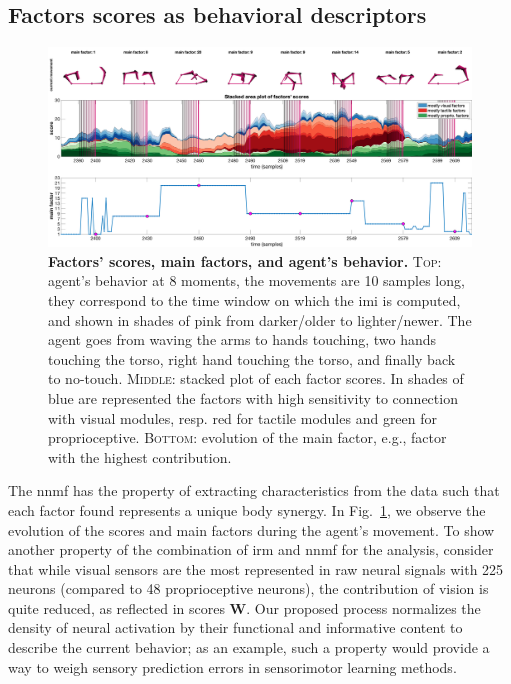 \documentclass[letterpaper, 10 pt, conference]{ieeeconf}  %
\begin{document}
\subsection{Factors scores as behavioral descriptors}
\begin{figure}[h!]
    \centering
    \includegraphics[width=.99\textwidth]{fig/factors_example_time.png}
    \caption{\textbf{Factors' scores, main factors, and agent's behavior.} \textsc{Top}: agent's behavior at 8 moments, the movements are 10 samples long, they correspond to the time window on which the \acl{imi} is computed, and shown in shades of pink from darker/older to lighter/newer. The agent goes from waving the arms to hands touching, two hands touching the torso, right hand touching the torso, and finally back to no-touch. \textsc{Middle}: stacked plot of each factor scores. In shades of blue are represented the factors with high sensitivity to connection with visual modules, resp. red for tactile modules and green for proprioceptive. \textsc{Bottom}: evolution of the main factor, e.g., factor with the highest contribution.}
    \label{fig:factors_time}
\end{figure}
The \acl{nnmf} has the property of extracting characteristics from the data such that each factor found represents a unique body synergy. In Fig.~\ref{fig:factors_time}, we observe the evolution of the scores and main factors during the agent's movement. To show another property of the combination of \ac{irm} and \ac{nnmf} for the analysis, consider that while visual sensors are the most represented in raw neural signals with 225 neurons (compared to 48 proprioceptive neurons), the contribution of vision is quite reduced, as reflected in scores $\bm{W}$. Our proposed process normalizes the density of neural activation by their functional and informative content to describe the current behavior; as an example, such a property would provide a way to weigh sensory prediction errors in sensorimotor learning methods.
\end{document}
